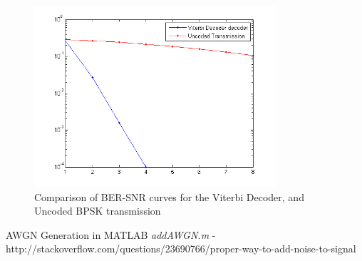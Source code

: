 \documentclass[paper=a4, fontsize=12pt]{scrartcl} %
\numberwithin{equation}{section} %
\numberwithin{figure}{section} %
\numberwithin{table}{section} %
\begin{document}
\begin{figure}
\centering
\includegraphics[width=0.8\textwidth]{images/ber3}
\caption{Comparison of BER-SNR curves for the Viterbi Decoder, and Uncoded BPSK transmission}
\label{ber}
\end{figure}

\begin{thebibliography}{155}
AWGN Generation in MATLAB \textit{addAWGN.m} - \\
http://stackoverflow.com/questions/23690766/proper-way-to-add-noise-to-signal
\end{thebibliography}
\end{document}
